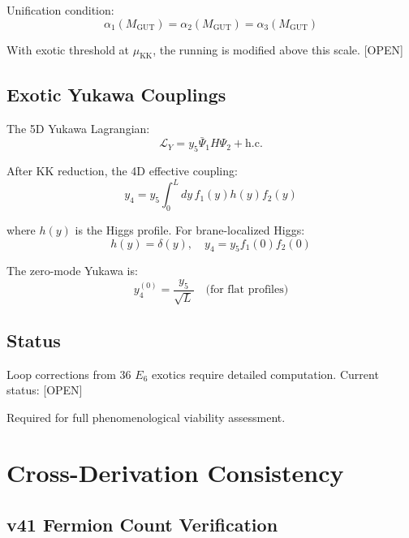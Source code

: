 \documentclass[11pt,a4paper]{article}
\newcommand{\tagOPEN}{\textcolor{red!70!black}{[OPEN]}}
\begin{document}
Unification condition:
\begin{equation}
\label{eq:unification-cond}
\alpha_1(M_{\text{GUT}}) = \alpha_2(M_{\text{GUT}}) = \alpha_3(M_{\text{GUT}})
\end{equation}

With exotic threshold at $\mu_{\text{KK}}$, the running is modified above this scale. \tagOPEN

\subsection{Exotic Yukawa Couplings}

The 5D Yukawa Lagrangian:
\begin{equation}
\label{eq:5d-yukawa}
\mathcal{L}_Y = y_5 \bar{\Psi}_1 H \Psi_2 + \text{h.c.}
\end{equation}

After KK reduction, the 4D effective coupling:
\begin{equation}
\label{eq:4d-yukawa}
y_4 = y_5 \int_0^L dy\, f_1(y) h(y) f_2(y)
\end{equation}

where $h(y)$ is the Higgs profile. For brane-localized Higgs:
\begin{equation}
\label{eq:brane-higgs}
h(y) = \delta(y), \quad y_4 = y_5 f_1(0) f_2(0)
\end{equation}

The zero-mode Yukawa is:
\begin{equation}
\label{eq:zero-mode-yukawa}
y_4^{(0)} = \frac{y_5}{\sqrt{L}} \quad \text{(for flat profiles)}
\end{equation}

\subsection{Status}

\begin{warningbox}
Loop corrections from 36 $E_6$ exotics require detailed computation.
Current status: \tagOPEN

Required for full phenomenological viability assessment.
\end{warningbox}

\section{Cross-Derivation Consistency}
\label{app:cross}

\subsection{v41 Fermion Count Verification}
\end{document}
